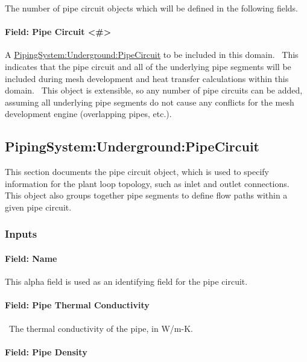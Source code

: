 The number of pipe circuit objects which will be defined in the following fields.

\paragraph{Field: Pipe Circuit \textless{}\#\textgreater{}}\label{field-pipe-circuit-1-to-n-extensible}

A \hyperref[pipingsystemundergroundpipecircuit]{PipingSystem:Underground:PipeCircuit} to be included in this domain.~ This indicates that the pipe circuit and all of the underlying pipe segments will be included during mesh development and heat transfer calculations within this domain.~ This object is extensible, so any number of pipe circuits can be added, assuming all underlying pipe segments do not cause any conflicts for the mesh development engine (overlapping pipes, etc.).

\subsection{PipingSystem:Underground:PipeCircuit}\label{pipingsystemundergroundpipecircuit}

This section documents the pipe circuit object, which is used to specify information for the plant loop topology, such as inlet and outlet connections.~ This object also groups together pipe segments to define flow paths within a given pipe circuit.

\subsubsection{Inputs}\label{inputs-10-010}

\paragraph{Field: Name}\label{field-name-10-009}

This alpha field is used as an identifying field for the pipe circuit.

\paragraph{Field: Pipe Thermal Conductivity}\label{field-pipe-thermal-conductivity-001}

~The thermal conductivity of the pipe, in W/m-K.

\paragraph{Field: Pipe Density}\label{field-pipe-density-000}

